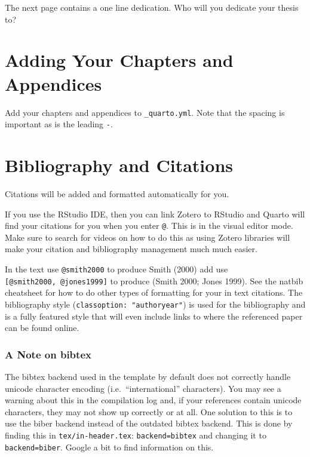 \documentclass[
  letterpaper,
  11pt,
  english,
  singlespacing,
  headsepline]{MastersDoctoralThesis}
\begin{document}
The next page contains a one line dedication. Who will you dedicate your
thesis to?

\section{Adding Your Chapters and
Appendices}\label{adding-your-chapters-and-appendices}

Add your chapters and appendices to \texttt{\_quarto.yml}. Note that the
spacing is important as is the leading \texttt{-}.

\section{Bibliography and Citations}\label{bibliography-and-citations}

Citations will be added and formatted automatically for you.

If you use the RStudio IDE, then you can link Zotero to RStudio and
Quarto will find your citations for you when you enter \texttt{@}. This
is in the visual editor mode. Make sure to search for videos on how to
do this as using Zotero libraries will make your citation and
bibliography management much much easier.

In the text use \texttt{@smith2000} to produce Smith (2000) add use
\texttt{{[}@smith2000,\ @jones1999{]}} to produce (Smith 2000; Jones
1999). See the natbib cheatsheet for how to do other types of formatting
for your in text citations. The bibliography style
(\texttt{classoption:\ "authoryear"}) is used for the bibliography and
is a fully featured style that will even include links to where the
referenced paper can be found online.

\subsubsection{A Note on bibtex}\label{a-note-on-bibtex}

The bibtex backend used in the template by default does not correctly
handle unicode character encoding (i.e.~``international'' characters).
You may see a warning about this in the compilation log and, if your
references contain unicode characters, they may not show up correctly or
at all. One solution to this is to use the biber backend instead of the
outdated bibtex backend. This is done by finding this in
\texttt{tex/in-header.tex}: \texttt{backend=bibtex} and changing it to
\texttt{backend=biber}. Google a bit to find information on this.
\end{document}
